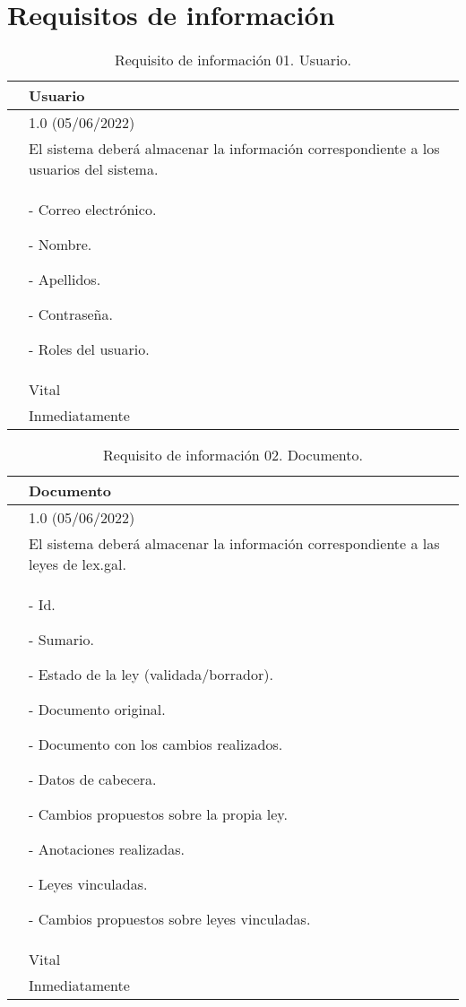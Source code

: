 \section{Requisitos de información}
\label{APRequisitosInformacion}

\begin{table}[H]
\begin{center}
\begin{tabular}{|p{3cm}|p{10cm}|} \hline
\centering {\bf IRQ-01} & Usuario  \\ \hline\hline
\centering {\bf Versión} & 1.0 (05/06/2022) \\ \hline
\centering {\bf Descripción} & El sistema deberá almacenar la información correspondiente a los usuarios del sistema. \\ \hline
\centering {\bf Datos específicos} & 
- Correo electrónico.

- Nombre.

- Apellidos.

- Contraseña.

- Roles del usuario.
\\ \hline
\centering {\bf Importancia} & Vital \\ \hline
\centering {\bf Urgencia} & Inmediatamente \\ \hline
\end{tabular}
\caption{Requisito de información 01. Usuario.}
\label{enlaceIRQ1}
\end{center}
\end{table}

\begin{table}[H]
\begin{center}
\begin{tabular}{|p{3cm}|p{10cm}|} \hline
\centering {\bf IRQ-02} & Documento  \\ \hline\hline
\centering {\bf Versión} & 1.0 (05/06/2022) \\ \hline
\centering {\bf Descripción} & El sistema deberá almacenar la información correspondiente a las leyes de lex.gal. \\ \hline
\centering {\bf Datos específicos}  & 
- Id.

- Sumario.

- Estado de la ley (validada/borrador).

- Documento original.

- Documento con los cambios realizados.

- Datos de cabecera.

- Cambios propuestos sobre la propia ley.

- Anotaciones realizadas.

- Leyes vinculadas.

- Cambios propuestos sobre leyes vinculadas.
\\ \hline
\centering {\bf Importancia} & Vital \\ \hline
\centering {\bf Urgencia} & Inmediatamente \\ \hline
\end{tabular}
\caption{Requisito de información 02. Documento.}
\label{enlaceIRQ2}
\end{center}
\end{table}